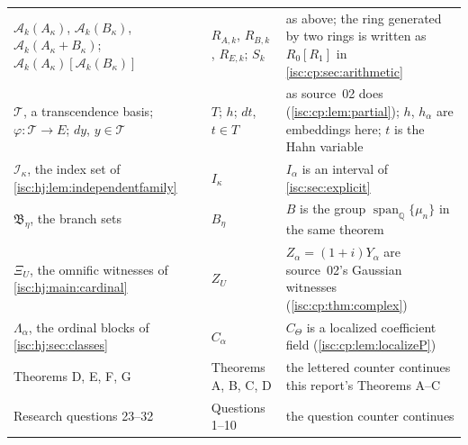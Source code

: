 \documentclass[11pt,letterpaper]{article}
\theoremstyle{definition}
\theoremstyle{remark}
\newcommand{\Q}{\mathbb Q}
\newcommand{\A}[2]{\mathcal A_{#1}(#2)}
\newcommand{\Span}{\operatorname{span}_{\Q}}
\numberwithin{equation}{section}
\begin{document}
\begin{center}
\begin{longtable}{@{}>{\raggedright\arraybackslash}p{}>{\raggedright\arraybackslash}p{}>{\raggedright\arraybackslash}p{}@{}}
$\A{k}{A_\kappa}$, $\A{k}{B_\kappa}$, $\A{k}{A_\kappa+B_\kappa}$;
$\A{k}{A_\kappa}[\A{k}{B_\kappa}]$ & $R_{A,k}$, $R_{B,k}$, $R_{E,k}$; $S_k$
& as above; the ring generated by two rings is written as
$R_0[R_1]$ in \cref{isc:cp:sec:arithmetic}\\
$\mathcal T$, a transcendence basis; $\varphi:\mathcal T\to E$; $dy$,
$y\in\mathcal T$ & $T$; $h$; $dt$, $t\in T$ & as source~02 does
(\cref{isc:cp:lem:partial}); $h$, $h_\alpha$ are embeddings here; $t$ is
the Hahn variable\\
$\mathcal I_\kappa$, the index set of \cref{isc:hj:lem:independentfamily}
& $I_\kappa$ & $I_\alpha$ is an interval of \cref{isc:sec:explicit}\\
$\mathfrak B_\eta$, the branch sets & $B_\eta$ & $B$ is the group
$\Span\{\mu_n\}$ in the same theorem\\
$\Xi_U$, the omnific witnesses of \cref{isc:hj:main:cardinal} & $Z_U$ &
$Z_\alpha=(1+i)Y_\alpha$ are source~02's Gaussian witnesses
(\cref{isc:cp:thm:complex})\\
$\Lambda_\alpha$, the ordinal blocks of \cref{isc:hj:sec:classes} &
$C_\alpha$ & $C_\Theta$ is a localized coefficient field
(\cref{isc:cp:lem:localizeP})\\
Theorems D, E, F, G & Theorems A, B, C, D & the lettered counter
continues this report's Theorems A--C\\
Research questions 23--32 & Questions 1--10 & the question counter
continues\\
\bottomrule
\end{longtable}
\end{center}
\end{document}
